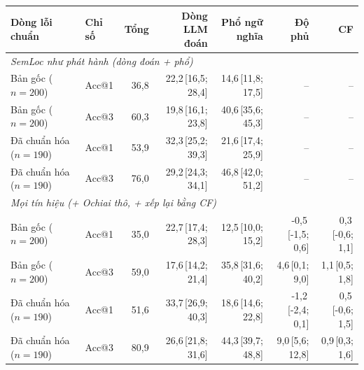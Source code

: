 \begin{tabular}{llrrrrr}
\toprule
Dòng lỗi chuẩn & Chỉ số & Tổng & Dòng LLM đoán & Phổ ngữ nghĩa & Độ phủ & CF \\
\midrule
\multicolumn{7}{l}{\emph{SemLoc như phát hành (dòng đoán + phổ)}} \\
Bản gốc ($n=200$) & Acc@1 & 36,8 & 22,2{\scriptsize\,[16,5; 28,4]} & 14,6{\scriptsize\,[11,8; 17,5]} & -- & -- \\
Bản gốc ($n=200$) & Acc@3 & 60,3 & 19,8{\scriptsize\,[16,1; 23,8]} & 40,6{\scriptsize\,[35,6; 45,3]} & -- & -- \\
Đã chuẩn hóa ($n=190$) & Acc@1 & 53,9 & 32,3{\scriptsize\,[25,2; 39,3]} & 21,6{\scriptsize\,[17,4; 25,9]} & -- & -- \\
Đã chuẩn hóa ($n=190$) & Acc@3 & 76,0 & 29,2{\scriptsize\,[24,3; 34,1]} & 46,8{\scriptsize\,[42,0; 51,2]} & -- & -- \\
\midrule
\multicolumn{7}{l}{\emph{Mọi tín hiệu (+ Ochiai thô, + xếp lại bằng CF)}} \\
Bản gốc ($n=200$) & Acc@1 & 35,0 & 22,7{\scriptsize\,[17,4; 28,3]} & 12,5{\scriptsize\,[10,0; 15,2]} & -0,5{\scriptsize\,[-1,5; 0,6]} & 0,3{\scriptsize\,[-0,6; 1,1]} \\
Bản gốc ($n=200$) & Acc@3 & 59,0 & 17,6{\scriptsize\,[14,2; 21,4]} & 35,8{\scriptsize\,[31,6; 40,2]} & 4,6{\scriptsize\,[0,1; 9,0]} & 1,1{\scriptsize\,[0,5; 1,8]} \\
Đã chuẩn hóa ($n=190$) & Acc@1 & 51,6 & 33,7{\scriptsize\,[26,9; 40,3]} & 18,6{\scriptsize\,[14,6; 22,8]} & -1,2{\scriptsize\,[-2,4; 0,1]} & 0,5{\scriptsize\,[-0,6; 1,5]} \\
Đã chuẩn hóa ($n=190$) & Acc@3 & 80,9 & 26,6{\scriptsize\,[21,8; 31,6]} & 44,3{\scriptsize\,[39,7; 48,8]} & 9,0{\scriptsize\,[5,6; 12,8]} & 0,9{\scriptsize\,[0,3; 1,6]} \\
\bottomrule
\end{tabular}
